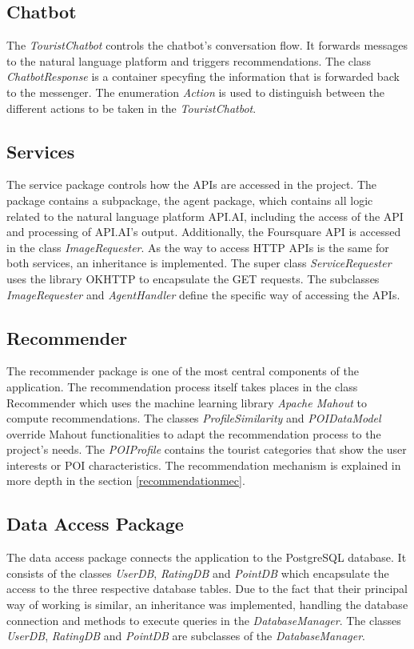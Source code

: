 \subsection{Chatbot}
The  \textit{TouristChatbot} controls the chatbot’s conversation flow. It forwards messages to the natural language platform and triggers recommendations. The class  \textit{ChatbotResponse} is a container specyfing the information that is forwarded back to the messenger. The enumeration  \textit{Action} is used to distinguish between the different actions to be taken in the  \textit{TouristChatbot}.


\subsection{Services}
The service package controls how the APIs are accessed in the project. The package contains a subpackage, the agent package, which contains all logic related to the natural language platform API.AI, including the access of the API and processing of API.AI’s output. Additionally, the Foursquare API is accessed in the class \textit{ImageRequester}. As the way to access HTTP APIs is the same for both services, an inheritance is implemented. The super class \textit{ServiceRequester} uses the library OKHTTP to encapsulate the GET requests. The subclasses \textit{ImageRequester} and \textit{AgentHandler} define the specific way of accessing the APIs.

\subsection{Recommender}
The recommender package is one of the most central components of the application. The recommendation process itself takes places in the class Recommender which uses the machine learning library \textit{Apache Mahout} to compute recommendations. The classes \textit{ProfileSimilarity} and \textit{POIDataModel} override Mahout functionalities to adapt the recommendation process to the project’s needs. The \textit{POIProfile} contains the tourist categories that show the user interests or POI characteristics. The recommendation mechanism is explained in more depth in the section \ref{recommendationmec}.



\subsection{Data Access Package}
The data access package connects the application to the PostgreSQL database. It consists of the classes \textit{UserDB}, \textit{RatingDB} and \textit{PointDB} which encapsulate the access to the three respective database tables. Due to the fact that their principal way of working is similar, an inheritance was implemented, handling the database connection and methods to execute queries in the \textit{DatabaseManager}. The classes \textit{UserDB}, \textit{RatingDB} and \textit{PointDB} are subclasses of the \textit{DatabaseManager}.

